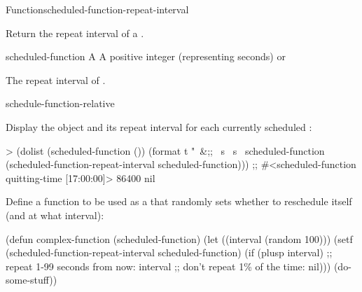 \documentclass[10pt,twoside,english,pdftex]{article}
\begin{document}

\begin{functiondoc}{Function}{scheduled-function-repeat-interval}%
  {}
%
%

\fnsyntax

\fnpurpose Return the repeat interval of a .

\fnsetf
{}%
  {}{}

\fnpackage {}

\fnmodule {}

\fnargs
\begin{args}{scheduled-function}
 A 
 A positive integer (representing seconds) or \nil
\end{args}

\fnreturns The repeat interval of . 

\begin{alsos}{schedule-function-relative}
\end{alsos}

%
\fnexamples 
Display the  object and its repeat interval for each
currently scheduled :
\begin{example}
> (dolist (scheduled-function ())
   (format t "~&;; ~s ~s~%
           scheduled-function
           (scheduled-function-repeat-interval scheduled-function)))
;; #<scheduled-function quitting-time [17:00:00]> 86400
nil
\end{example}

Define a function to be used as a  that randomly
sets whether to reschedule itself (and at what interval):
\begin{example}
  (defun complex-function (scheduled-function)
    (let ((interval (random 100)))
      (setf (scheduled-function-repeat-interval scheduled-function)
            (if (plusp interval) 
                ;; repeat 1-99 seconds from now:
                interval
                ;; don't repeat 1\% of the time:
                nil)))
    (do-some-stuff))
\end{example}

\end{functiondoc}
\end{document}
